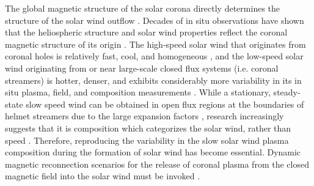 \documentclass[preprint]{aastex62}
\begin{document}
The global magnetic structure of the solar corona directly
determines the structure of the solar wind outflow
\citep[e.g.][]{Zirker1977,Axford1999, Antiochos2007, Antiochos2011,
Cranmer2012}. Decades of in situ observations have shown that the
heliospheric structure and solar wind properties reflect the coronal
magnetic structure of its origin \citep{Zurbuchen2007}. The high-speed
solar wind that originates from coronal holes is relatively fast,
cool, and homogeneous \citep{Geiss1995, McComas2002}, and the
low-speed solar wind originating from or near large-scale closed
flux systems (i.e. coronal streamers) is hotter, denser, and exhibits
considerably more variability in its in situ plasma, field, and
composition measurements \citep{Gosling1997, Zurbuchen2000,
Zurbuchen2002, Kepko2016}.
%
While a stationary, steady-state slow speed wind can be obtained
in open flux regions at the boundaries of helmet streamers due to the large expansion factors \citep{Arge2000,
Cranmer2012, WangYM2012}, research increasingly suggests that it
is composition which categorizes the solar wind, rather than speed
\citep[e.g.][]{Stakhiv2015, Stakhiv2016}. Therefore, reproducing the
variability in the slow solar wind plasma composition during the
formation of solar wind has become essential. Dynamic
magnetic reconnection scenarios for the release
of coronal plasma from the closed magnetic field into the solar wind must be invoked
\citep[e.g.][]{WangYM2000, Antiochos2011, Higginson2017a, Uritsky2017}.
\end{document}
